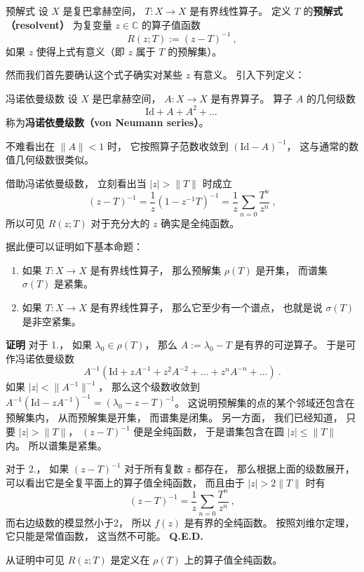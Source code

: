 

\begin{definition}{预解式}
设 $X$ 是复巴拿赫空间， $T:X\to X$ 是有界线性算子。 定义 $T$ 的\textbf{预解式（resolvent）} 为复变量 $z\in\mathbb{C}$ 的算子值函数
$$
R(z;T):=(z-T)^{-1}~,
$$
如果 $z$ 使得上式有意义（即 $z$ 属于 $T$ 的预解集）。
\end{definition}

然而我们首先要确认这个式子确实对某些 $z$ 有意义。 引入下列定义：

\begin{definition}{冯诺依曼级数}
设 $X$ 是巴拿赫空间， $A:X\to X$ 是有界算子。 算子 $A$ 的几何级数
$$
\text{Id}+A+A^2+\dots~
$$
称为\textbf{冯诺依曼级数（von Neumann series）}。
\end{definition}
不难看出在 $\|A\|<1$ 时， 它按照算子范数收敛到 $(\text{Id}-A)^{-1}$， 这与通常的数值几何级数很类似。 

借助冯诺依曼级数， 立刻看出当 $|z|>\|T\|$ 时成立
$$
(z-T)^{-1}
=\frac{1}{z}(1-z^{-1}T)^{-1}
=\frac{1}{z}\sum_{n=0}\frac{T^n}{z^n}~,
$$
所以可见 $R(z;T)$ 对于充分大的 $z$ 确实是全纯函数。

据此便可以证明如下基本命题：

\begin{theorem}{}
\begin{enumerate}
\item 如果 $T:X\to X$ 是有界线性算子， 那么预解集 $\rho(T)$ 是开集， 而谱集 $\sigma(T)$ 是紧集。
\item 如果 $T:X\to X$ 是有界线性算子， 那么它至少有一个谱点， 也就是说 $\sigma(T)$ 是非空紧集。
\end{enumerate}
\end{theorem}
\textbf{证明} 
对于 1.， 如果 $\lambda_0\in\rho(T)$， 那么 $A:=\lambda_0-T$ 是有界的可逆算子。 于是可作冯诺依曼级数
$$
A^{-1}(\text{Id}+zA^{-1}+z^2A^{-2}+\dots+z^nA^{-n}+\dots)~.
$$
如果 $|z|<\|A^{-1}\|^{-1}$， 那么这个级数收敛到 $A^{-1}(\text{Id}-zA^{-1})^{-1}=(\lambda_0-z-T)^{-1}$。 这说明预解集的点的某个邻域还包含在预解集内， 从而预解集是开集， 而谱集是闭集。 另一方面， 我们已经知道， 只要 $|z|>\|T\|$， $(z-T)^{-1}$ 便是全纯函数， 于是谱集包含在圆 $|z|\leq\|T\|$ 内。 所以谱集是紧集。

对于 2.， 如果 $(z-T)^{-1}$ 对于所有复数 $z$ 都存在， 那么根据上面的级数展开， 可以看出它是全复平面上的算子值全纯函数， 而且由于 $|z|>2\|T\|$ 时有
$$
(z-T)^{-1}=\frac{1}{z}\sum_{n=0}\frac{T^n}{z^n}~,
$$
而右边级数的模显然小于2， 所以 $f(z)$ 是有界的全纯函数。 按照刘维尔定理， 它只能是常值函数， 这当然不可能。 \textbf{Q.E.D.}

从证明中可见 $R(z;T)$ 是定义在 $\rho(T)$ 上的算子值全纯函数。